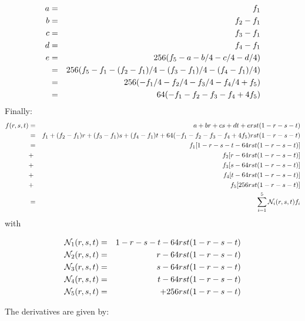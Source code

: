 \begin{eqnarray}
a&=&f_1     \nonumber\\
b&=&f_2-f_1 \nonumber\\
c&=&f_3-f_1 \nonumber\\
d&=&f_4-f_1 \nonumber\\
e&=&256(f_5-a-b/4-c/4-d/4) \nonumber\\
&=&256(f_5-f_1-(f_2-f_1)/4-(f_3-f_1)/4-(f_4-f_1)/4) \nonumber\\
&=&256(-f_1/4 - f_2/4 - f_3/4 - f_4/4 + f_5  ) \nonumber\\
&=&64(-f_1 - f_2 - f_3 - f_4 + 4f_5  )
\end{eqnarray}
Finally:
\begin{eqnarray}
f(r,s,t)
&=& a+br+cs+dt+erst(1-r-s-t) \nonumber\\
&=& f_1 + (f_2-f_1)r + (f_3-f_1)s + (f_4-f_1)t+ 64(-f_1 - f_2 - f_3 - f_4 + 4f_5  ) rst(1-r-s-t)  \nonumber\\
&=& f_1 [1-r-s-t - 64rst(1-r-s-t)]\nonumber\\
&+& f_2 [r- 64rst(1-r-s-t)]\nonumber\\
&+& f_3 [s- 64rst(1-r-s-t)]\nonumber\\
&+& f_4 [t- 64rst(1-r-s-t)]\nonumber\\
&+& f_5 [256 rst(1-r-s-t)] \nonumber\\
&=&\sum_{i=1}^5 {\mathcal{N}}_i(r,s,t) f_i
\end{eqnarray}
with
\begin{mdframed}[backgroundcolor=blue!5]
\begin{eqnarray}
{\mathcal{N}}_1(r,s,t) &=& 1-r-s-t - 64rst(1-r-s-t) \\
{\mathcal{N}}_2(r,s,t) &=& r - 64rst(1-r-s-t) \\
{\mathcal{N}}_3(r,s,t) &=& s - 64rst(1-r-s-t) \\
{\mathcal{N}}_4(r,s,t) &=& t - 64rst(1-r-s-t) \\
{\mathcal{N}}_5(r,s,t) &=&  + 256rst(1-r-s-t) 
\end{eqnarray}
\end{mdframed}
The derivatives are given by:
